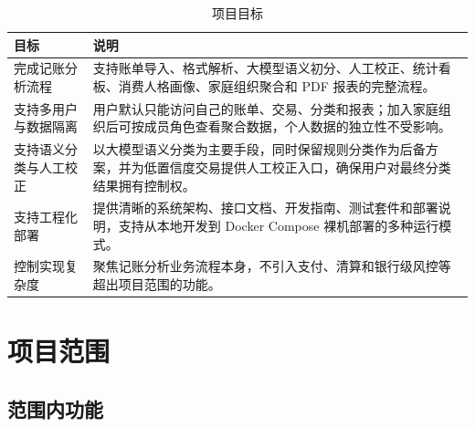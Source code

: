 \begin{table}[H]
\centering
\caption{项目目标}
\label{tab:project-goals}
\begin{tabular}{p{3.8cm}p{9.4cm}}
\toprule
\textbf{目标} & \textbf{说明} \\
\midrule
完成记账分析流程 & 支持账单导入、格式解析、大模型语义初分、人工校正、统计看板、消费人格画像、家庭组织聚合和 PDF 报表的完整流程。 \\
\addlinespace
支持多用户与数据隔离 & 用户默认只能访问自己的账单、交易、分类和报表；加入家庭组织后可按成员角色查看聚合数据，个人数据的独立性不受影响。 \\
\addlinespace
支持语义分类与人工校正 & 以大模型语义分类为主要手段，同时保留规则分类作为后备方案，并为低置信度交易提供人工校正入口，确保用户对最终分类结果拥有控制权。 \\
\addlinespace
支持工程化部署 & 提供清晰的系统架构、接口文档、开发指南、测试套件和部署说明，支持从本地开发到 Docker Compose 裸机部署的多种运行模式。 \\
\addlinespace
控制实现复杂度 & 聚焦记账分析业务流程本身，不引入支付、清算和银行级风控等超出项目范围的功能。 \\
\bottomrule
\end{tabular}
\end{table}

\section{项目范围}

\subsection{范围内功能}

